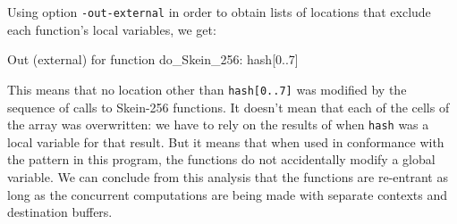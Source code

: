 \documentclass{frama-c-book}
\begin{document}
Using option \verb|-out-external| in order to obtain lists of
locations that exclude each function's local variables, we get:
\begin{logsmath}
[inout] Out (external) for function do_Skein_256:
          hash[0..7]
\end{logsmath}
This means that no location other than \lstinline|hash[0..7]| was
modified by the sequence of calls to Skein-256 functions. It doesn't
mean that each of the cells of the array was overwritten: we have to
rely on the results of \Eva{} when \lstinline|hash| was a
local variable for that result. But it means that when used in
conformance with the pattern in this program, the functions do not
accidentally modify a global variable. We can conclude from this
analysis that the functions are re-entrant as long as the concurrent
computations are being made with separate contexts and destination
buffers.
\end{document}

